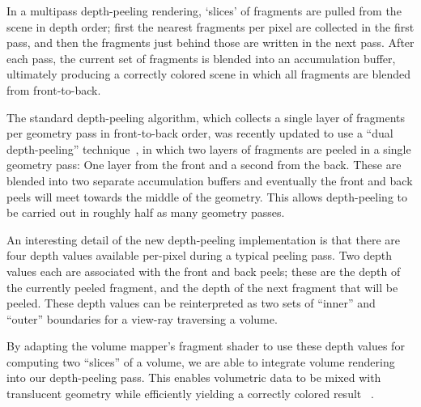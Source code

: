 In a multipass depth-peeling rendering, `slices' of fragments are pulled from
the scene in depth order; first the nearest fragments per pixel are collected in
the first pass, and then the fragments just behind those are written in the next
pass. After each pass, the current set of fragments is blended into an
accumulation buffer, ultimately producing a correctly colored scene in which all
fragments are blended from front-to-back.

The standard depth-peeling algorithm, which collects a single layer of fragments
per geometry pass in front-to-back order, was recently updated to use a ``dual
depth-peeling'' technique~\citep{bavoil_order_2008}, in which two layers of
fragments are peeled in a single geometry pass: One layer from the front and a
second from the back. These are blended into two separate accumulation buffers
and eventually the front and back peels will meet towards the middle of the
geometry. This allows depth-peeling to be carried out in roughly half as many
geometry passes.

An interesting detail of the new depth-peeling implementation is that there are
four depth values available per-pixel during a typical peeling pass. Two depth
values each are associated with the front and back peels; these are the depth of
the currently peeled fragment, and the depth of the next fragment that will be
peeled. These depth values can be reinterpreted as two sets of ``inner'' and
``outer'' boundaries for a view-ray traversing a volume.

By adapting the volume mapper's fragment shader to use these depth values for
computing two ``slices'' of a volume, we are able to integrate volume rendering
into our depth-peeling pass. This enables volumetric data to be mixed with
translucent geometry while efficiently yielding a correctly colored result
~.


